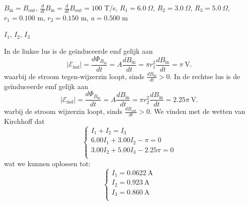     \begin{description}[labelwidth=1.5cm, leftmargin=!]
        \item[Geg. :] $B_{\text{in}} = B_{\text{out}}$, $\frac{d}{dt} B_{\text{in}} = \frac{d}{dt} B_{\text{out}} = 100$ T/s, $R_1 = 6.0 \ \Omega$, $R_2 = 3.0 \ \Omega$, $R_3 = 5.0 \ \Omega$, $r_1 = 0.100$ m, $r_2 = 0.150$ m, $a = 0.500$ m
        \item[Gevr. :] $I_1$, $I_2$, $I_3$
        \item[Opl. :]
            In de linkse lus is de geïnduceerde emf gelijk aan
            \begin{equation*}
                \left| \mathcal{E}_{\text{ind}} \right| =  \frac{d\Phi_{B_{\text{in}}}}{dt} = A\frac{dB_{\text{in}}}{dt} = \pi r_1^2 \frac{dB_{\text{in}}}{dt}  = \pi \ \text{V}.
            \end{equation*}
            waarbij de stroom tegen-wijzerzin loopt, sinds $\frac{dB_{\text{in}}}{dt} > 0$. In de rechtse lus is de geïnduceerde emf gelijk aan
            \begin{equation*}
                \left| \mathcal{E}_{\text{ind}} \right| =  \frac{d\Phi_{B_{\text{in}}}}{dt} = A\frac{dB_{\text{in}}}{dt} = \pi r_2^2 \frac{dB_{\text{in}}}{dt}  = 2.25\pi \ \text{V}.
            \end{equation*}
            warbij de stroom wijzerzin loopt, sinds $\frac{dB_{\text{out}}}{dt} > 0$. We vinden met de wetten van Kirchhoff dat
            \begin{equation*}
                \begin{cases}
                    I_1 + I_2 = I_3 \\
                    6.00I_1 + 3.00I_2 - \pi = 0 \\
                    3.00I_2 + 5.00I_3 - 2.25\pi = 0 \\
                \end{cases}
            \end{equation*} 
            wat we kunnen oplossen tot:
            \begin{equation*}
                \begin{cases}
                    I_1 = 0.0622 \ \text{A} \\
                    I_2 = 0.923 \ \text{A} \\
                    I_3 = 0.860 \ \text{A} \\
                \end{cases}
            \end{equation*}
    \end{description}


\vspace{1cm}